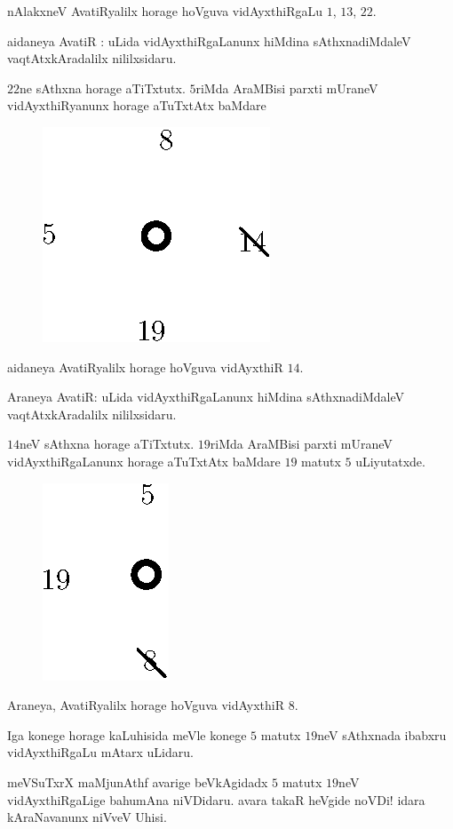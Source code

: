nAlakxneV AvatiRyalilx horage hoVguva vidAyxthiRgaLu $1$, $13$, $22$.

aidaneya AvatiR : uLida vidAyxthiRgaLanunx hiMdina sAthxnadiMdaleV vaqtAtxkAradalilx nililxsidaru.

$22$ne sAthxna horage aTiTxtutx. $5$riMda AraMBisi parxti mUraneV vidAyxthiRyanunx horage aTuTxtAtx baMdare
\begin{figure}[H]
\centering
\includegraphics[scale=0.8]{src/figures/fig13.eps}
\end{figure}

aidaneya AvatiRyalilx horage hoVguva vidAyxthiR $14$.

Araneya AvatiR: uLida vidAyxthiRgaLanunx hiMdina sAthxnadiMdaleV vaqtAtxkAradalilx nililxsidaru.

$14$neV sAthxna horage aTiTxtutx. $19$riMda AraMBisi parxti mUraneV vidAyxthiRgaLanunx horage aTuTxtAtx baMdare $19$ matutx $5$ uLiyutatxde. 
\begin{figure}[H]
\centering
\includegraphics[scale=0.8]{src/figures/fig14.eps}
\end{figure}

Araneya, AvatiRyalilx horage hoVguva vidAyxthiR $8$.

Iga konege horage kaLuhisida meVle konege $5$ matutx $19$neV sAthxnada ibabxru vidAyxthiRgaLu mAtarx uLidaru.

meVSuTxrX maMjunAthf avarige beVkAgidadx $5$ matutx $19$neV vidAyxthiRgaLige bahumAna niVDidaru. avara takaR heVgide noVDi! idara kAraNavanunx niVveV Uhisi.
